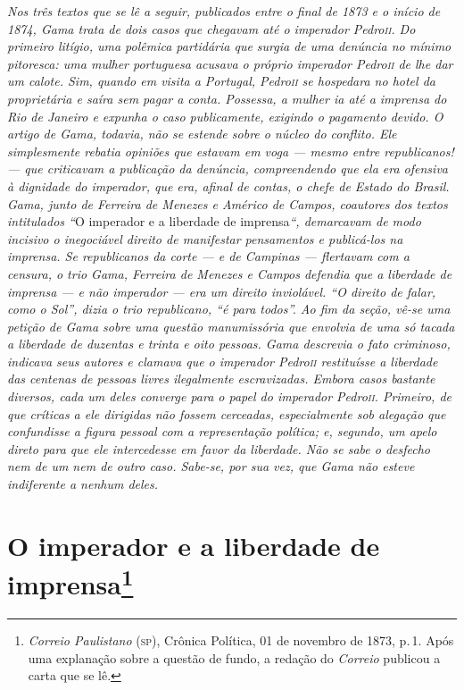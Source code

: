 \begin{argumento}
\emph{Nos três textos que se lê a seguir, publicados entre o final de
1873 e o início de 1874, Gama trata de dois casos que chegavam até o
imperador Pedro\textsc{ii}. Do primeiro litígio, uma polêmica partidária que
surgia de uma denúncia no mínimo pitoresca: uma mulher portuguesa
acusava o próprio imperador Pedro\textsc{ii} de lhe dar um calote. Sim, quando
em visita a Portugal, Pedro\textsc{ii} se hospedara no hotel da proprietária e
saíra sem pagar a conta. Possessa, a mulher ia até a imprensa do Rio de
Janeiro e expunha o caso publicamente, exigindo o pagamento devido. O
artigo de Gama, todavia, não se estende sobre o núcleo do conflito. Ele
simplesmente rebatia opiniões que estavam em voga --- mesmo entre
republicanos! --- que criticavam a publicação da denúncia, compreendendo
que ela era ofensiva à dignidade do imperador, que era, afinal de
contas, o chefe de Estado do Brasil. Gama, junto de Ferreira de Menezes
e Américo de Campos, coautores dos textos intitulados ``}O imperador e a
liberdade de imprensa\emph{``, demarcavam de modo incisivo o inegociável
direito de manifestar pensamentos e publicá-los na imprensa. Se
republicanos da corte --- e de Campinas --- flertavam com a censura, o
trio Gama, Ferreira de Menezes e Campos defendia que a liberdade de
imprensa --- e não imperador --- era um direito inviolável. ``O direito de
falar, como o Sol'', dizia o trio republicano, ``é para todos''. Ao fim da
seção, vê-se uma petição de Gama sobre uma questão manumissória que
envolvia de uma só tacada a liberdade de duzentas e trinta e oito
pessoas. Gama descrevia o fato criminoso, indicava seus autores e
clamava que o imperador Pedro\textsc{ii} restituísse a liberdade das centenas de
pessoas livres ilegalmente escravizadas. Embora casos bastante diversos,
cada um deles converge para o papel do imperador Pedro\textsc{ii}. Primeiro, de
que críticas a ele dirigidas não fossem cerceadas, especialmente sob
alegação que confundisse a figura pessoal com a representação política;
e, segundo, um apelo direto para que ele intercedesse em favor da
liberdade. Não se sabe o desfecho nem de um nem de outro caso. Sabe-se,
por sua vez, que Gama não esteve indiferente a nenhum deles.}
\end{argumento}

\chapter{O imperador e a liberdade de imprensa\footnote{\emph{Correio Paulistano} (\textsc{sp}), Crônica Política,
  01 de novembro de 1873, p.\,1. Após uma explanação sobre a questão de fundo, a
  redação do \emph{Correio} publicou a carta que se lê.}} %

